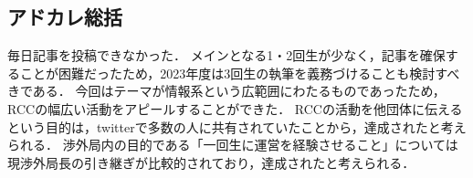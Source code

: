 \subsection*{アドカレ総括}


毎日記事を投稿できなかった．
メインとなる1・2回生が少なく，記事を確保することが困難だったため，2023年度は3回生の執筆を義務づけることも検討すべきである．
今回はテーマが情報系という広範囲にわたるものであったため，RCCの幅広い活動をアピールすることができた．
RCCの活動を他団体に伝えるという目的は，twitterで多数の人に共有されていたことから，達成されたと考えられる．
渉外局内の目的である「一回生に運営を経験させること」については現渉外局長の引き継ぎが比較的されており，達成されたと考えられる．

